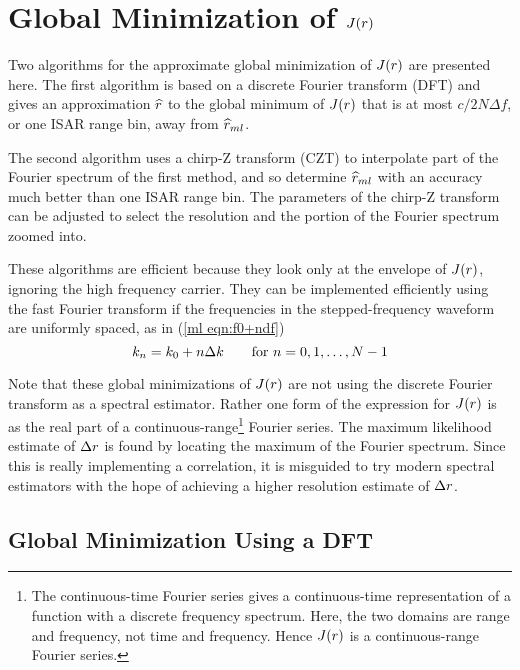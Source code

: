 \section{Global Minimization of $J({r})$}
\label{ee sec:agm}

Two algorithms for the approximate global minimization of $J({r})$ are
presented here.  The first algorithm is based on a discrete Fourier
transform (DFT) and gives an approximation $\widehat{r}$ to the global minimum of
$J({r})$ that is at most $c/2N\Delta f$, or one ISAR range bin, away from
$\widehat{r}_{ml}$.

The second algorithm uses a chirp-Z transform (CZT) \cite{Rab69b,Rab69a} 
to interpolate part of the Fourier spectrum of the first
method, and so determine $\widehat{r}_{ml}$ with an accuracy much better than one ISAR range
bin.  The parameters of the chirp-Z transform can be adjusted to select the
resolution and the portion of the Fourier spectrum zoomed into.

These algorithms are efficient because they look only at the envelope of
$J({r})$, ignoring the high frequency carrier.  They can be implemented
efficiently using the fast Fourier transform if the
frequencies in the stepped-frequency waveform are uniformly spaced, as in
(\ref{ml eqn:f0+ndf})
\begin{equation}\label{ee eqn:fn}
k_n=k_0+n{\Delta k}\qquad\mbox{for $n=0,1,\ldots,N-1$}
\end{equation}

Note that these global minimizations of $J({r})$ are not using the discrete
Fourier transform as a spectral estimator.  Rather one form of the expression
for $J({r})$ is as the real part of a continuous-range\footnote{\label{ee
ftn:crft}The
continuous-time Fourier series gives a continuous-time representation of a 
function with a discrete frequency spectrum.  Here, the two domains are
range and frequency, not time and frequency.  Hence $J({r})$ is a
continuous-range Fourier series.} Fourier series.  The maximum likelihood
estimate of ${\Delta r}$ is found by locating the maximum of the Fourier spectrum.
Since this is really implementing a correlation, it is misguided to try
modern spectral estimators with the hope of achieving a higher resolution 
estimate of ${\Delta r}$.

\subsection{Global Minimization Using a DFT}

